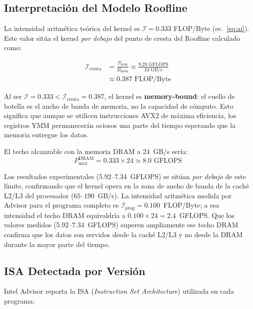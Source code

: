 \subsection{Interpretaci\'on del Modelo Roofline}

La intensidad aritm\'etica te\'orica del kernel es
$\mathcal{I} = 0.333$ FLOP/Byte (ec.~\ref{eq:ai}).
Este valor sit\'ua el kernel \textit{por debajo} del punto de
cresta del Roofline calculado como:

\begin{equation}
\begin{split}
  \mathcal{I}_{\text{cresta}} &=
  \frac{P_{\text{peak}}}{B_{\text{mem}}} \approx
  \frac{9.28 \text{ GFLOPS}}{24 \text{ GB/s}} \\
  &\approx 0.387 \text{ FLOP/Byte}
\end{split}
\end{equation}

Al ser $\mathcal{I} = 0.333 < \mathcal{I}_{\text{cresta}} = 0.387$,
el kernel es \textbf{memory-bound}: el cuello de botella es el
ancho de banda de memoria, no la capacidad de c\'omputo.
Esto significa que aunque se utilicen instrucciones AVX2 de
m\'axima eficiencia, los registros YMM permanecer\'an ociosos
una parte del tiempo esperando que la memoria entregue los datos.

El techo alcanzable con la memoria DRAM a $24$~GB/s ser\'ia:
\begin{equation}
  P_{\max}^{\text{DRAM}} = 0.333 \times 24 \approx 8.0 \text{ GFLOPS}
\end{equation}

Los resultados experimentales (5.92--7.34~GFLOPS) se sit\'uan
\emph{por debajo} de este l\'imite, confirmando que el kernel
opera en la zona de ancho de banda de la cach\'e L2/L3
del procesador ($65$--$190$~GB/s).
La intensidad aritm\'etica medida por Advisor para el programa
completo es $\mathcal{I}_{\text{prog}} = 0.100$~FLOP/Byte;
a esa intensidad el techo DRAM equivaldr\'ia a
$0.100 \times 24 = 2.4$~GFLOPS.
Que los valores medidos (5.92--7.34~GFLOPS) superen ampliamente
ese techo DRAM confirma que los datos son servidos desde la
cach\'e L2/L3 y no desde la DRAM durante la mayor parte del tiempo.

\subsection{ISA Detectada por Versi\'on}

Intel Advisor reporta la ISA (\textit{Instruction Set Architecture})
utilizada en cada programa:

